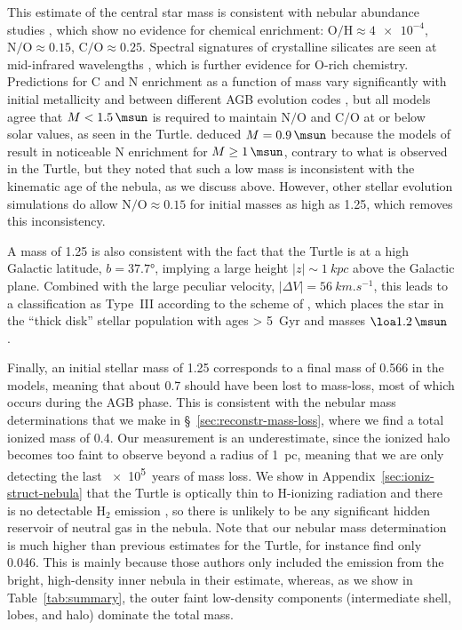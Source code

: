 \documentclass[useAMS, usenatbib]{mnras}
\newcommand*\chem[1]{\ensuremath{\mathrm{#1}}}
\begin{document}
This estimate of the central star mass is consistent with nebular abundance studies
\citep{Liu:2004a, Pottasch:2009a, Delgado-Inglada:2009a, Bohigas:2015c}, which show no evidence for chemical enrichment: \(\chem{O/H} \approx \num{4e-4}\), \(\chem{N/O} \approx 0.15\), \(\chem{C/O} \approx 0.25\).
Spectral signatures of crystalline silicates are seen at mid-infrared wavelengths
\citep{Delgado-Inglada:2014a}, which is further evidence for O-rich chemistry.
Predictions for C and N enrichment as a function of mass
vary significantly with initial metallicity
and between different AGB evolution codes \citep[Figs.~8 and 9 of][]{Henry:2018a},
but all models agree that \(M < \SI{1.5}{\msun}\) is required to maintain \chem{N/O} and \chem{C/O} at or below solar values, as seen in the Turtle.
\citet{Pottasch:2009a} deduced \(M = \SI{0.9}{\msun}\) because the models of \citet{Karakas:2007a} result in noticeable N enrichment for \(M \ge \SI{1}{\msun}\),
contrary to what is observed in the Turtle,
but they noted that such a low mass is inconsistent with the kinematic age of the nebula,
as we discuss above.
However, other stellar evolution simulations \citep{Ventura:2005a, Di-Criscienzo:2016a}
do allow \(\chem{N/O} \approx 0.15\) for initial masses as high as \SI{1.25}{\msun},
which removes this inconsistency.

A mass of \SI{1.25}{\msun} is also consistent with the fact that the Turtle is at a high Galactic latitude, \(b = \ang{37.7}\),
implying a large height \(|z| \sim \SI{1}{kpc} \) above the Galactic plane.
Combined with the large peculiar velocity, \(|\Delta V| = \SI{56}{km.s^{-1}}\),
this leads to a classification as Type~III \citep{Quireza:2007a} according to the scheme of \citet{Peimbert:1978a},
which places the star in the ``thick disk'' stellar population
with ages \SI{> 5}{Gyr}
and masses \(\loa \SI{1.2}{\msun}\) \citep{Maciel:1994b, Stanghellini:2018a}.

Finally, an initial stellar mass of \SI{1.25}{\msun} corresponds to a final mass of \SI{0.566}{\msun} in the \citet{Miller-Bertolami:2016a} models,
meaning that about \SI{0.7}{\msun} should have been lost to mass-loss,
most of which occurs during the AGB phase.
This is consistent with the nebular mass determinations that we make in \S~\ref{sec:reconstr-mass-loss},
where we find a total ionized mass of \SI{0.4}{\msun}.
Our measurement is an underestimate,
since the ionized halo becomes too faint to observe beyond a radius of \SI{1}{pc},
meaning that we are only detecting the last \SI{e5}{years} of mass loss.
We show in Appendix~\ref{sec:ioniz-struct-nebula} that the Turtle is optically thin to H-ionizing radiation and there is no detectable \chem{H_2} emission \citep{Kastner:1996a},
so there is unlikely to be any significant hidden reservoir of neutral gas in the nebula.
Note that our nebular mass determination is much higher than previous estimates for the Turtle,
for instance \citet{Bohigas:2015c} find only \SI{0.046}{\msun}.
This is mainly because those authors only included the emission from the bright,
high-density inner nebula in their estimate,
whereas, as we show in Table~\ref{tab:summary}, the outer faint low-density components
(intermediate shell, lobes, and halo) dominate the total mass.
\end{document}

